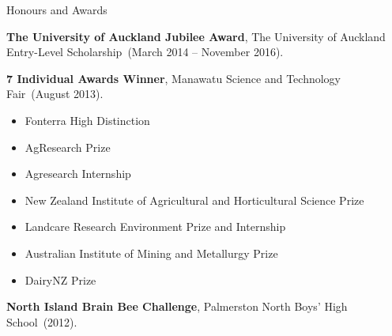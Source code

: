 \documentclass[11pt]{tracv}
\begin{document}
\begin{hangingsection}{Honours and Awards}

		\hangingentry \textbf{The University of Auckland Jubilee Award}, The University of Auckland Entry-Level Scholarship~(March 2014 -- November 2016).

		\hangingentry \textbf{7 Individual Awards Winner}, Manawatu Science and Technology Fair~(August 2013).\\
		\begin{itemize}
		\item Fonterra High Distinction
		\item AgResearch Prize
		\item Agresearch Internship
		\item New Zealand Institute of Agricultural and Horticultural Science Prize
		\item Landcare Research Environment Prize and Internship
		\item Australian Institute of Mining and Metallurgy Prize
		\item DairyNZ Prize
		\end{itemize}
		
		\hangingentry \textbf{North Island Brain Bee Challenge}, Palmerston North Boys' High School~(2012).

\end{hangingsection}
\end{document}
